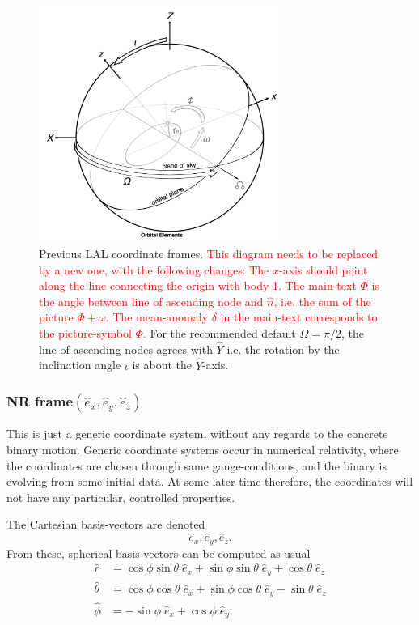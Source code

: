 \documentclass[aps,prd,amssymb,amsmath,amsfonts,superscriptaddress,
floatfix ,preprintnumbers,altaffilletter]{revtex4}
\newcommand{\red}{\textcolor{red}}
\newcommand{\ExNR}{\hat e_x}
\newcommand{\EyNR}{\hat e_y}
\newcommand{\EzNR}{\hat e_z}
\newcommand{\tNR}{\theta}
\newcommand{\pNR}{\phi}
\newcommand{\ErNR}{{\hat r}}
\newcommand{\EtNR}{{\hat\theta}}
\newcommand{\EpNR}{{\hat\phi}}
\newcommand{\nNR}{\hat{n}}
\newcommand{\EyW}{\hat Y}
\newcommand{\phiRef}{\Phi} %
\newcommand{\meanAnomaly}{\delta} %
\begin{document}
\begin{figure}
  \includegraphics[width=80mm]{lalsiminspiral_orbitelements.png}
  \caption{
  \label{fig:frames} Previous LAL coordinate frames.
    \red{This diagram needs to be replaced by a new one, with the
      following changes: The $x$-axis should point along the line
      connecting the origin with body 1.  The main-text $\phiRef$ is
      the angle between line of ascending node and $\nNR$, i.e. the
      sum of the picture $\Phi+\omega$.  The mean-anomaly
      $\meanAnomaly$ in the main-text corresponds to the
      picture-symbol $\Phi$.} For the recommended default
    $\Omega=\pi/2$, the line of ascending nodes agrees with $\EyW$
    i.e. the rotation by the inclination angle $\iota$ is about the
    $\EyW$-axis.}
  \end{figure}


\subsubsection{NR frame\boldmath$(  \ExNR, \EyNR, \EzNR)$}

This is just a generic coordinate system, without any regards to the
concrete binary motion.  Generic coordinate systems occur in numerical
relativity, where the coordinates are chosen through same
gauge-conditions, and the binary is evolving from some initial data.
At some later time therefore, the coordinates will not have any
particular, controlled properties.

The Cartesian basis-vectors are denoted
\begin{equation}
  \ExNR, \EyNR, \EzNR.
\end{equation}
From these, spherical basis-vectors can be computed as usual
\begin{subequations}
  \label{eq:NRspherical}
\begin{align}
  \ErNR & = \cos\pNR\sin\tNR\;\ExNR + \sin\pNR\sin\tNR\;\EyNR +\cos\tNR\;\EzNR\\
  \EtNR & = \cos\pNR\cos\tNR\;\ExNR + \sin\pNR\cos\tNR\;\EyNR -\sin\tNR\;\EzNR\\
  \EpNR & =        -\sin\pNR\;\ExNR +         \cos\pNR\;\EyNR.
\end{align}
\end{subequations}
\end{document}
